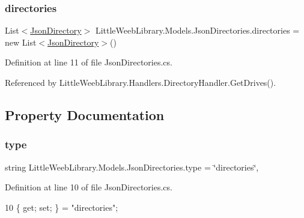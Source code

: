 \subsubsection{\texorpdfstring{directories}{directories}}
{\footnotesize\ttfamily List$<$\mbox{\hyperlink{class_little_weeb_library_1_1_models_1_1_json_directory}{Json\+Directory}}$>$ Little\+Weeb\+Library.\+Models.\+Json\+Directories.\+directories = new List$<$\mbox{\hyperlink{class_little_weeb_library_1_1_models_1_1_json_directory}{Json\+Directory}}$>$()}



Definition at line 11 of file Json\+Directories.\+cs.



Referenced by Little\+Weeb\+Library.\+Handlers.\+Directory\+Handler.\+Get\+Drives().



\subsection{Property Documentation}
\mbox{\label{class_little_weeb_library_1_1_models_1_1_json_directories_a2cc6b2f3d096a90439b9492b889921be}} 
\subsubsection{\texorpdfstring{type}{type}}
{\footnotesize\ttfamily string Little\+Weeb\+Library.\+Models.\+Json\+Directories.\+type = \char`\"{}directories\char`\"{}\hspace{0.3cm}{\ttfamily [get]}, {\ttfamily [set]}}



Definition at line 10 of file Json\+Directories.\+cs.


\begin{DoxyCode}
10 \{ \textcolor{keyword}{get}; \textcolor{keyword}{set}; \} = \textcolor{stringliteral}{"directories"};
\end{DoxyCode}
\mbox{\label{class_little_weeb_library_1_1_models_1_1_json_directories_a674e1e3950c199b1558ba3202b66a79b}} 
